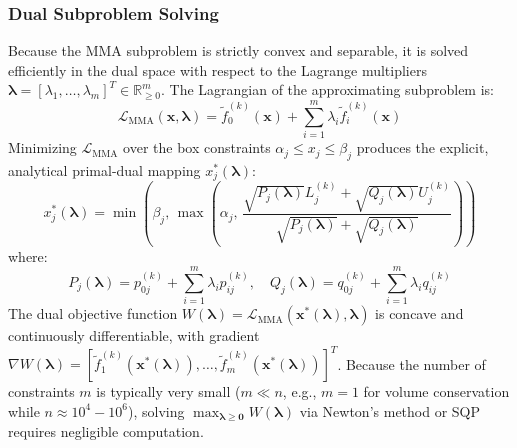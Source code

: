 \documentclass[11pt, a4paper]{article}
\begin{document}
\subsubsection{Dual Subproblem Solving}
Because the MMA subproblem is strictly convex and separable, it is solved efficiently in the dual space with respect to the Lagrange multipliers $\boldsymbol{\lambda} = [\lambda_1, \dots, \lambda_m]^T \in \mathbb{R}^m_{\ge 0}$. The Lagrangian of the approximating subproblem is:
\begin{equation}
\mathcal{L}_{\text{MMA}}(\mathbf{x}, \boldsymbol{\lambda}) = \tilde{f}_0^{(k)}(\mathbf{x}) + \sum_{i=1}^m \lambda_i \tilde{f}_i^{(k)}(\mathbf{x})
\end{equation}
Minimizing $\mathcal{L}_{\text{MMA}}$ over the box constraints $\alpha_j \le x_j \le \beta_j$ produces the explicit, analytical primal-dual mapping $x_j^*(\boldsymbol{\lambda})$:
\begin{equation}
x_j^*(\boldsymbol{\lambda}) = \min\left( \beta_j, \, \max\left( \alpha_j, \, \frac{\sqrt{P_j(\boldsymbol{\lambda})} L_j^{(k)} + \sqrt{Q_j(\boldsymbol{\lambda})} U_j^{(k)}}{\sqrt{P_j(\boldsymbol{\lambda})} + \sqrt{Q_j(\boldsymbol{\lambda})}} \right) \right)
\end{equation}
where:
\begin{equation}
P_j(\boldsymbol{\lambda}) = p_{0j}^{(k)} + \sum_{i=1}^m \lambda_i p_{ij}^{(k)}, \quad Q_j(\boldsymbol{\lambda}) = q_{0j}^{(k)} + \sum_{i=1}^m \lambda_i q_{ij}^{(k)}
\end{equation}
The dual objective function $W(\boldsymbol{\lambda}) = \mathcal{L}_{\text{MMA}}(\mathbf{x}^*(\boldsymbol{\lambda}), \boldsymbol{\lambda})$ is concave and continuously differentiable, with gradient $\nabla W(\boldsymbol{\lambda}) = [\tilde{f}_1^{(k)}(\mathbf{x}^*(\boldsymbol{\lambda})), \dots, \tilde{f}_m^{(k)}(\mathbf{x}^*(\boldsymbol{\lambda}))]^T$. Because the number of constraints $m$ is typically very small ($m \ll n$, e.g., $m=1$ for volume conservation while $n \approx 10^4 - 10^6$), solving $\max_{\boldsymbol{\lambda} \ge \mathbf{0}} W(\boldsymbol{\lambda})$ via Newton's method or SQP requires negligible computation.
\end{document}
